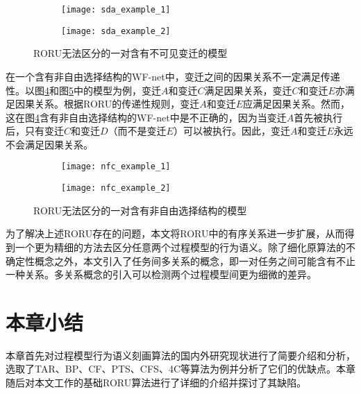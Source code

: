 \begin{figure}[htbp]
  \centering
  \begin{subfigure}[b]{0.45\textwidth}
    \centering
    \texttt{[image: sda\_example\_1]}
    \caption{\label{fig:sda_example_1}}
  \end{subfigure}
  \hspace{1em}
  \begin{subfigure}[b]{0.45\textwidth}
    \centering
    \texttt{[image: sda\_example\_2]}
    \caption{\label{fig:sda_example_2}}
  \end{subfigure}
  \vspace{6pt}
  \caption{RORU无法区分的一对含有不可见变迁的模型}
  \label{fig:sda_example}
\end{figure}

在一个含有非自由选择结构\cite{de2003workflow}的WF-net中，变迁之间的因果关系不一定满足传递性。以图\ref{fig:nfc_example_1}和图\ref{fig:nfc_example_2}中的模型为例，变迁$A$和变迁$C$满足因果关系，变迁$C$和变迁$E$亦满足因果关系。根据RORU的传递性规则，变迁$A$和变迁$E$应满足因果关系。然而，这在图\ref{fig:nfc_example_1}含有非自由选择结构的WF-net中是不正确的，因为当变迁$A$首先被执行后，只有变迁$C$和变迁$D$（而不是变迁$E$）可以被执行。因此，变迁$A$和变迁$E$永远不会满足因果关系。

\begin{figure}[htbp]
  \centering
  \begin{subfigure}[b]{0.45\textwidth}
    \centering
    \texttt{[image: nfc\_example\_1]}
    \caption{\label{fig:nfc_example_1}}
  \end{subfigure}
  \hspace{1em}
  \begin{subfigure}[b]{0.45\textwidth}
    \centering
    \texttt{[image: nfc\_example\_2]}
    \caption{\label{fig:nfc_example_2}}
  \end{subfigure}
  \vspace{6pt}
  \caption{RORU无法区分的一对含有非自由选择结构的模型}
  \label{fig:nfc_example}
\end{figure}

为了解决上述RORU存在的问题，本文将RORU中的有序关系进一步扩展，从而得到一个更为精细的方法去区分任意两个过程模型的行为语义。除了细化原算法的不确定性概念之外，本文引入了任务间多关系的概念，即一对任务之间可能含有不止一种关系。多关系概念的引入可以检测两个过程模型间更为细微的差异。

\section{本章小结}
本章首先对过程模型行为语义刻画算法的国内外研究现状进行了简要介绍和分析，选取了TAR、BP、CF、PTS、CFS、4C等算法为例并分析了它们的优缺点。本章随后对本文工作的基础RORU算法进行了详细的介绍并探讨了其缺陷。